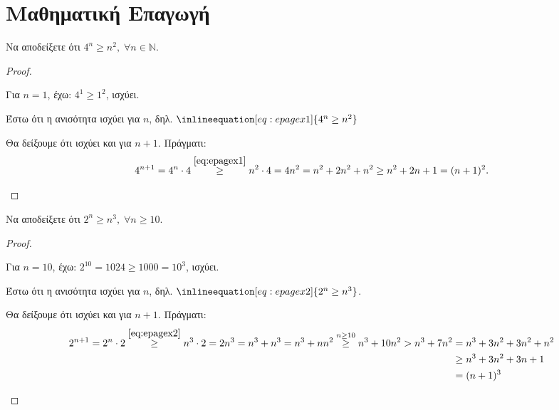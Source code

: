 \documentclass[main.tex]{subfiles}
\begin{document}
\section{Μαθηματική Επαγωγή}


\begin{example}
  Να αποδείξετε ότι $ 4^{n} \geq n^{2}, \; \forall n \in \mathbb{N} $.
\end{example}
\begin{proof}
\item {}
  \begin{myitemize}
    \item Για $ n=1 $, έχω: $ 4^{1} \geq 1^{2} $, ισχύει.
    \item Έστω ότι η ανισότητα ισχύει για $n$, δηλ. 
      $\inlineequation[eq:epagex1]{4^{n} \geq n^{2}}$
    \item Θα δείξουμε ότι ισχύει και για $ n+1 $. Πράγματι:
      \begin{align*}
        4^{n+1} = 4^{n}\cdot 4 \overset{\eqref{eq:epagex1}}{\geq}
        n^{2}\cdot 4 
        = 4n^{2} = n^{2} + 2n^{2} + n^{2} \geq n^{2} + 2n + 1 = (n+1)^{2}.
      \end{align*}
  \end{myitemize}
\end{proof}

\begin{example}
  Να αποδείξετε ότι $ 2^{n} \geq n^{3}, \; \forall n \geq 10 $.
\end{example}
\begin{proof}
\item {}
  \begin{myitemize}
    \item Για $ n=10 $, έχω: $ 2^{10} = 1024 \geq 1000 = 10^{3}  $, 
      ισχύει.
    \item Έστω ότι η ανισότητα ισχύει για $n$, δηλ. 
      $\inlineequation[eq:epagex2]{2^{n} \geq n^{3}}$.
    \item Θα δείξουμε ότι ισχύει και για $ n+1 $. Πράγματι:
      \begin{align*}
        2^{n+1} = 2^{n} \cdot 2 \overset{\eqref{eq:epagex2}}{\geq} n^{3} 
        \cdot 2 = 2n^{3} = n^{3} + n^{3} = n^{3} + nn^{2} \overset{n\geq 10}
        {\geq} n^{3}+10n^{2} > n^{3}+7n^{2} &= n^{3} + 3n^{2} + 3n^{2} + n^{2} \\ 
                                            &\geq  n^{3} + 3n^{2} + 3n + 1 \\ 
                                            &= (n+1)^{3}
      \end{align*} 
  \end{myitemize}
\end{proof}
\end{document}
